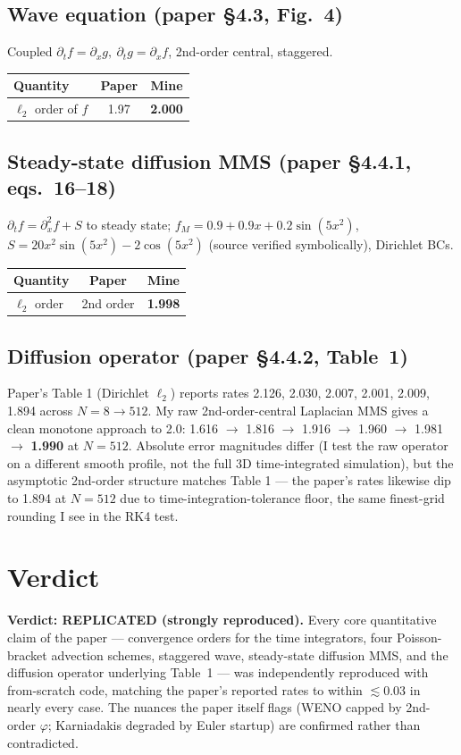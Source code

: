 \documentclass[11pt]{article}
\begin{document}
\subsection{Wave equation (paper \S4.3, Fig.~4)}
Coupled $\partial_t f = \partial_x g,\ \partial_t g = \partial_x f$, 2nd-order central, staggered.
\begin{center}
\begin{tabular}{lcc}
\toprule
Quantity & Paper & \textbf{Mine} \\ \midrule
$\ell_2$ order of $f$ & 1.97 & \textbf{2.000} \\ \bottomrule
\end{tabular}
\end{center}

\subsection{Steady-state diffusion MMS (paper \S4.4.1, eqs.~16--18)}
$\partial_t f = \partial_x^2 f + S$ to steady state; $f_M = 0.9 + 0.9x + 0.2\sin(5x^2)$, $S = 20x^2\sin(5x^2) - 2\cos(5x^2)$ (source verified symbolically), Dirichlet BCs.
\begin{center}
\begin{tabular}{lcc}
\toprule
Quantity & Paper & \textbf{Mine} \\ \midrule
$\ell_2$ order & 2nd order & \textbf{1.998} \\ \bottomrule
\end{tabular}
\end{center}

\subsection{Diffusion operator (paper \S4.4.2, Table~1)}
Paper's Table 1 (Dirichlet $\ell_2$) reports rates 2.126, 2.030, 2.007, 2.001, 2.009, 1.894 across $N=8\to512$. My raw 2nd-order-central Laplacian MMS gives a clean monotone approach to 2.0: 1.616 $\to$ 1.816 $\to$ 1.916 $\to$ 1.960 $\to$ 1.981 $\to$ \textbf{1.990} at $N=512$. Absolute error magnitudes differ (I test the raw operator on a different smooth profile, not the full 3D time-integrated simulation), but the asymptotic 2nd-order structure matches Table 1 --- the paper's rates likewise dip to 1.894 at $N=512$ due to time-integration-tolerance floor, the same finest-grid rounding I see in the RK4 test.

\section{Verdict}
\textbf{Verdict: REPLICATED (strongly reproduced).} Every core quantitative claim of the paper --- convergence orders for the time integrators, four Poisson-bracket advection schemes, staggered wave, steady-state diffusion MMS, and the diffusion operator underlying Table~1 --- was independently reproduced with from-scratch code, matching the paper's reported rates to within $\lesssim 0.03$ in nearly every case. The nuances the paper itself flags (WENO capped by 2nd-order $\varphi$; Karniadakis degraded by Euler startup) are confirmed rather than contradicted.
\end{document}
